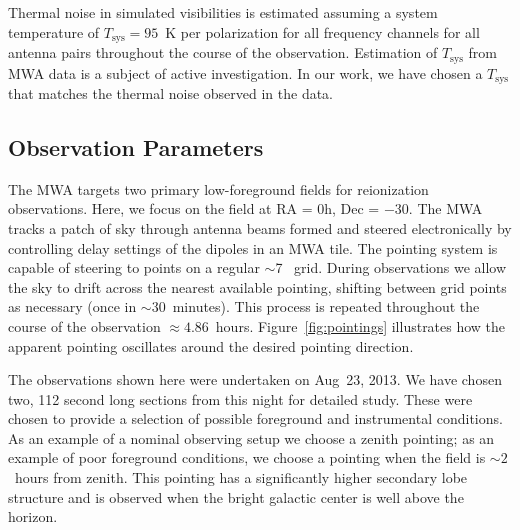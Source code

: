 \documentclass[preprint2,iop,numberedappendix]{emulateapj}
\begin{document}

Thermal noise in simulated visibilities is estimated assuming a system temperature of $T_\textrm{sys}=95$~K per polarization for all frequency channels for all antenna pairs throughout the course of the observation. Estimation of $T_\textrm{sys}$ from MWA data is a subject of active investigation. In our work, we have chosen a $T_\textrm{sys}$ that matches the thermal noise observed in the data. %

\subsection{Observation Parameters}\label{sec:obsparms}

The MWA targets two primary low-foreground fields for reionization observations. Here, we focus on the field at RA = 0h, Dec = $-30$\arcdeg. The MWA tracks a patch of sky through antenna beams formed and steered electronically by controlling delay settings of the dipoles in an MWA tile. The pointing system is capable of steering to points on a regular $\sim$7\arcdeg~ grid. During observations we allow the sky to drift across the nearest available pointing, shifting between grid points as necessary (once in $\sim 30$~minutes). This process is repeated throughout the course of the observation $\approx 4.86$~hours. Figure~\ref{fig:pointings} illustrates how the apparent pointing oscillates around the desired pointing direction. 

The observations shown here were undertaken on Aug~23, 2013. %
We have chosen two, 112 second long sections from this night for detailed study. These were chosen to provide a selection of possible foreground and instrumental conditions. As an example of a nominal observing setup we choose a zenith pointing; as an example of poor foreground conditions, we choose a pointing when the field is $\sim 2$~hours from zenith. This pointing has a significantly higher secondary lobe structure and is observed when the bright galactic center is well above the horizon. 
\end{document}
